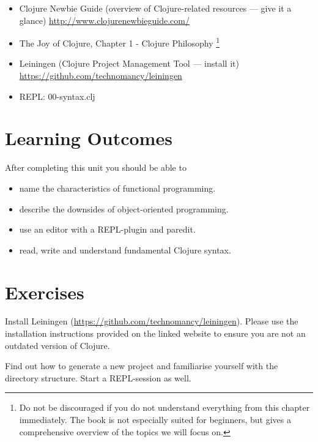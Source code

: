 \documentclass[11pt,a4paper]{article}
\begin{document}
	\begin{itemize}
        \item Clojure Newbie Guide (overview of Clojure-related resources --- give it a glance) \url{http://www.clojurenewbieguide.com/}
        \item The Joy of Clojure, Chapter 1 - Clojure Philosophy
		\footnote{Do not be discouraged if you do not understand everything from this chapter immediately. The book is not especially suited for beginners, but gives a comprehensive overview of the topics we will focus on.}
        \item Leiningen (Clojure Project Management Tool --- install it) \url{https://github.com/technomancy/leiningen}
        \item REPL: 00-syntax.clj
	\end{itemize}
	
	
	\section{Learning Outcomes}
	
	After completing this unit you should be able to
	
	\begin{itemize}
		\item name the characteristics of functional programming.
		\item describe the downsides of object-oriented programming.
		\item use an editor with a REPL-plugin and paredit.
        \item read, write and understand fundamental Clojure syntax.
	\end{itemize}
	
	\section{Exercises}

	\begin{exercise}[Leiningen]
		Install Leiningen (\url{https://github.com/technomancy/leiningen}).
		Please use the installation instructions provided on the linked website
		to ensure you are not an outdated version of Clojure.
		
		Find out how to generate a new project
		and familiarise yourself with the directory structure.
		Start a REPL-session as well.
	\end{exercise}
	
\end{document}
